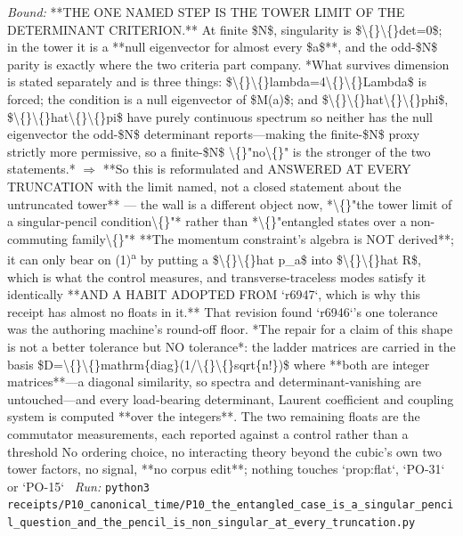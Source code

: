 \begin{description}
 \emph{Bound:}  **THE ONE NAMED STEP IS THE TOWER LIMIT OF THE DETERMINANT CRITERION.** At finite \$N\$, singularity is \$\textbackslash\{\}\textbackslash\{\}det=0\$; in the tower it is a **null eigenvector for almost every \$a\$**, and the odd-\$N\$ parity is exactly where the two criteria part company. *What survives dimension is stated separately and is three things: \$\textbackslash\{\}\textbackslash\{\}lambda=4\textbackslash\{\}\textbackslash\{\}Lambda\$ is forced; the condition is a null eigenvector of \$M(a)\$; and \$\textbackslash\{\}\textbackslash\{\}hat\textbackslash\{\}\textbackslash\{\}phi\$, \$\textbackslash\{\}\textbackslash\{\}hat\textbackslash\{\}\textbackslash\{\}pi\$ have purely continuous spectrum so neither has the null eigenvector the odd-\$N\$ determinant reports---making the finite-\$N\$ proxy strictly more permissive, so a finite-\$N\$ \textbackslash\{\}"no\textbackslash\{\}" is the stronger of the two statements.* \ensuremath{\Rightarrow} **So this is reformulated and ANSWERED AT EVERY TRUNCATION with the limit named, not a closed statement about the untruncated tower** --- the wall is a different object now, *\textbackslash\{\}"the tower limit of a singular-pencil condition\textbackslash\{\}"* rather than *\textbackslash\{\}"entangled states over a non-commuting family\textbackslash\{\}"*  **The momentum constraint's algebra is NOT derived**; it can only bear on (1)\textsuperscript{a} by putting a \$\textbackslash\{\}\textbackslash\{\}hat p\_a\$ into \$\textbackslash\{\}\textbackslash\{\}hat R\$, which is what the control measures, and transverse-traceless modes satisfy it identically  **AND A HABIT ADOPTED FROM `r6947`, which is why this receipt has almost no floats in it.** That revision found `r6946`'s one tolerance was the authoring machine's round-off floor. *The repair for a claim of this shape is not a better tolerance but NO tolerance*: the ladder matrices are carried in the basis \$D=\textbackslash\{\}\textbackslash\{\}mathrm\{diag\}(1/\textbackslash\{\}\textbackslash\{\}sqrt\{n!\})\$ where **both are integer matrices**---a diagonal similarity, so spectra and determinant-vanishing are untouched---and every load-bearing determinant, Laurent coefficient and coupling system is computed **over the integers**. The two remaining floats are the commutator measurements, each reported against a control rather than a threshold  No ordering choice, no interacting theory beyond the cubic's own two tower factors, no signal, **no corpus edit**; nothing touches `prop:flat`, `PO-31` or `PO-15`
\ \emph{Run:} \texttt{python3 receipts/P10\_canonical\_time/P10\_the\_entangled\_case\_is\_a\_singular\_pencil\_question\_and\_the\_pencil\_is\_non\_singular\_at\_every\_truncation.py}

\end{description}
